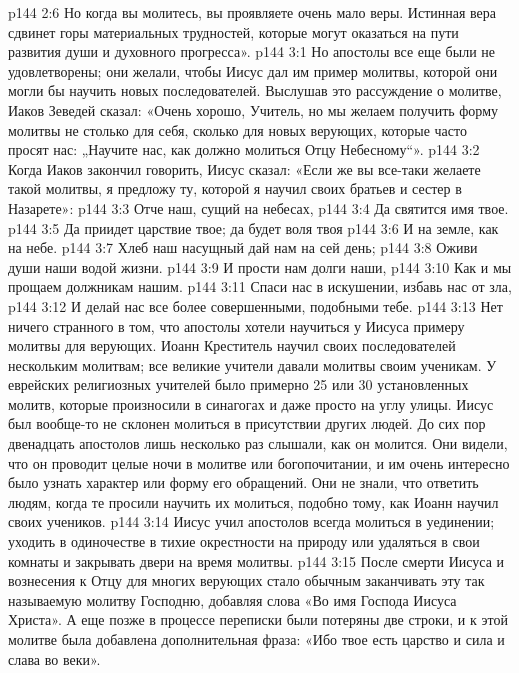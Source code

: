 \vs p144 2:6 Но когда вы молитесь, вы проявляете очень мало веры. Истинная вера сдвинет горы материальных трудностей, которые могут оказаться на пути развития души и духовного прогресса».
\vs p144 3:1 Но апостолы все еще были не удовлетворены; они желали, чтобы Иисус дал им пример молитвы, которой они могли бы научить новых последователей. Выслушав это рассуждение о молитве, Иаков Зеведей сказал: «Очень хорошо, Учитель, но мы желаем получить форму молитвы не столько для себя, сколько для новых верующих, которые часто просят нас: „Научите нас, как должно молиться Отцу Небесному“».
\vs p144 3:2 Когда Иаков закончил говорить, Иисус сказал: «Если же вы все\hyp{}таки желаете такой молитвы, я предложу ту, которой я научил своих братьев и сестер в Назарете»:
\vsetoff
\vs p144 3:3 Отче наш, сущий на небесах,
\vs p144 3:4 \hsetoff Да святится имя твое.
\vs p144 3:5 Да приидет царствие твое; да будет воля твоя
\vs p144 3:6 \hsetoff И на земле, как на небе.
\vs p144 3:7 Хлеб наш насущный дай нам на сей день;
\vs p144 3:8 \hsetoff Оживи души наши водой жизни.
\vs p144 3:9 И прости нам долги наши,
\vs p144 3:10 \hsetoff Как и мы прощаем должникам нашим.
\vs p144 3:11 Спаси нас в искушении, избавь нас от зла,
\vs p144 3:12 \hsetoff И делай нас все более совершенными, подобными тебе.
\vsetoff
\vs p144 3:13 Нет ничего странного в том, что апостолы хотели научиться у Иисуса примеру молитвы для верующих. Иоанн Креститель научил своих последователей нескольким молитвам; все великие учители давали молитвы своим ученикам. У еврейских религиозных учителей было примерно 25 или 30 установленных молитв, которые произносили в синагогах и даже просто на углу улицы. Иисус был вообще\hyp{}то не склонен молиться в присутствии других людей. До сих пор двенадцать апостолов лишь несколько раз слышали, как он молится. Они видели, что он проводит целые ночи в молитве или богопочитании, и им очень интересно было узнать характер или форму его обращений. Они не знали, что ответить людям, когда те просили научить их молиться, подобно тому, как Иоанн научил своих учеников.
\vs p144 3:14 Иисус учил апостолов всегда молиться в уединении; уходить в одиночестве в тихие окрестности на природу или удаляться в свои комнаты и закрывать двери на время молитвы.
\vs p144 3:15 После смерти Иисуса и вознесения к Отцу для многих верующих стало обычным заканчивать эту так называемую молитву Господню, добавляя слова «Во имя Господа Иисуса Христа». А еще позже в процессе переписки были потеряны две строки, и к этой молитве была добавлена дополнительная фраза: «Ибо твое есть царство и сила и слава во веки».
